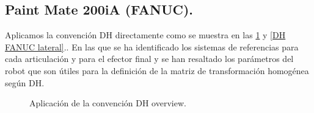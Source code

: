 \documentclass[a4paper,12pt]{article}
\begin{document}
\subsection{Paint Mate 200iA (FANUC).}

Aplicamos la convención DH directamente como se muestra en las \cref{DH FANUC overview} y \cref{DH FANUC lateral}..
En las que se ha identificado los sistemas de referencias para cada articulación y para el efector final
y se han resaltado los parámetros del robot que son útiles para la definición de la matriz de transformación 
homogénea según DH.

\begin{figure}[H]
    \centering
    \begin{adjustbox}{scale = 0.9, max width=\columnwidth}
    \end{adjustbox}
    \caption{Aplicación de la convención DH overview.}
    \label{DH FANUC overview}
\end{figure}
\end{document}
